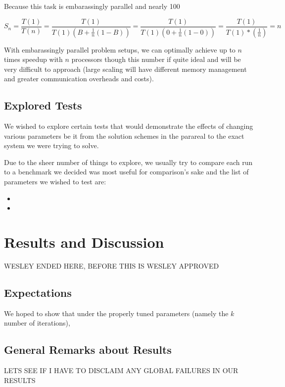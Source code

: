 \documentclass[letterpaper,12pt]{article}
\begin{document}
Because this task is embarassingly parallel and nearly 100%

\[
S_{n} = \frac{T(1)}{T(n)} = \frac{T(1)}{ T(1) \left( B + \frac{1}{n} (1-B) \right)} = \frac{T(1)}{T(1) \left( 0 + \frac{1}{n} (1-0) \right)} = \frac{T(1)}{T(1) * \left( \frac{1}{n} \right) } = n
\]

With embarassingly parallel problem setups, we can optimally achieve up to $n$ times speedup with $n$ processors though this number if quite ideal and will be very difficult to approach (large scaling will have different memory management and greater communication overheads and costs).

\subsection{Explored Tests}


We wished to explore certain tests that would demonstrate the effects of changing various parameters be it from the solution schemes in the parareal to the exact system we were trying to solve.

Due to the sheer number of things to explore, we usually try to compare each run to a benchmark we decided was most useful for comparison's sake and the list of parameters we wished to test are:

\begin{itemize}
\item
\item
\end{itemize}

\section{Results and Discussion}

WESLEY ENDED HERE, BEFORE THIS IS WESLEY APPROVED

\subsection{Expectations}
We hoped to show that under the properly tuned parameters (namely the $k$ number of iterations),

\subsection{General Remarks about Results}
LETS SEE IF I HAVE TO DISCLAIM ANY GLOBAL FAILURES IN OUR RESULTS
\end{document}
